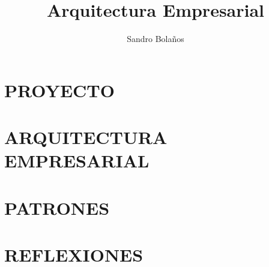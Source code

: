 \documentclass[11pt]{book}
\title{Arquitectura Empresarial}
\author{Sandro Bolaños}
\begin{document}
\maketitle	
\tableofcontents
\part{PROYECTO}


\part{ARQUITECTURA EMPRESARIAL}






\part{PATRONES}



\part{REFLEXIONES}


\end{document}
